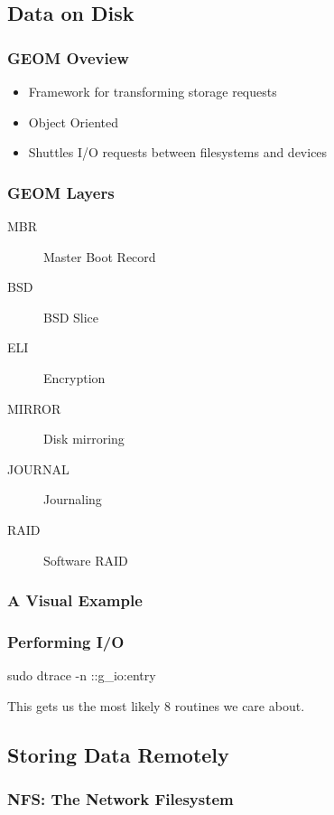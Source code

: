 \documentclass[pdftex]{beamer} %
\begin{document}
\subsection{Data on Disk}
\label{sec:disk}

\begin{frame}
  \frametitle{GEOM Oveview}
  \begin{itemize}
  \item Framework for transforming storage requests
  \item Object Oriented
  \item Shuttles I/O requests between filesystems and devices
  \end{itemize}
\end{frame}

\begin{frame}
  \frametitle{GEOM Layers}
  \begin{description}
  \item[MBR] Master Boot Record
  \item[BSD] BSD Slice
  \item[ELI] Encryption
  \item[MIRROR] Disk mirroring
  \item[JOURNAL] Journaling
  \item[RAID] Software RAID
\end{description}
\end{frame}

\begin{frame}
  \frametitle{A Visual Example}
  
\end{frame}

\begin{frame}
  \frametitle{Performing I/O}
sudo dtrace -n ::g\_io\*:entry  

This gets us the most likely 8 routines we care about.

\end{frame}

\subsection{Storing Data Remotely}
\label{sec:remote_storage}

\begin{frame}
  \frametitle{NFS: The Network Filesystem}
  
\end{frame}
\end{document}
